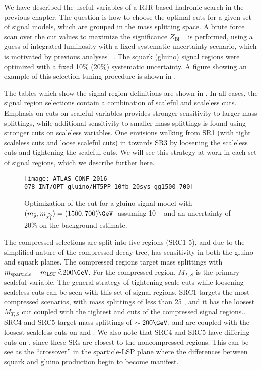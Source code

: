We have described the useful variables of a RJR-based hadronic search in the previous chapter.
The question is how to choose the optimal cuts for a given set of signal models, which are grouped in the mass splitting space.
A brute force scan over the cut values to maximize the significance  $Z_{\text{Bi}}$ ~\cite{Cousins:2008zz} is performed, using a guess of integrated luminosity with a fixed systematic uncertainty scenario, which is motivated by previous analyses ~\cite{0-leptonPaper,0LPaper_13TeV}.
The squark (gluino) signal regions were optimized with a fixed 10\% (20\%) systematic uncertainty.
A figure showing an example of this selection tuning procedure is shown in .

The tables which show the signal region definitions are shown in .
In all cases, the signal region selections contain a combination of scaleful and scaleless cuts.
Emphasis on cuts on scaleful variables provides stronger sensitivity to larger mass splittings, while additional sensitivity to smaller mass splittings is found using stronger cuts on scaleless variables.
One envisions walking from SR1 (with tight scaleless cuts and loose scaleful cuts) in  towards SR3 by loosening the scaleless cuts and tightening the scaleful cuts.
We will see this strategy at work in each set of signal regions, which we describe further here.

\begin{figure}[tbp]
\caption{Optimization of the  cut for a gluino signal model with $(m_{\gluino}, m_{\lsp} ) = (1500,700) \GeV~ $ assuming 10 \ifb~ and an uncertainty of 20\% on the background estimate.
} \label{fig:sr_optimization}
\texttt{[image: ATLAS-CONF-2016-078\_INT/OPT\_gluino/HT5PP\_10fb\_20sys\_gg1500\_700]}
\end{figure}

The compressed selections are split into five regions (SRC1-5), and due to the simplified nature of the compressed decay tree, has sensitivity in both the gluino and squark planes.
The compressed regions target mass splittings with $m_{\text{sparticle}} - m_{\text{LSP}} \tilde{<} 200 \GeV$.
For the compressed region, $M_{T, S}$ is the primary scaleful variable.
The general strategy of tightening scale cuts while loosening scaleless cuts can be seen with this set of signal regions.
SRC1 targets the most compressed scenarios, with mass splittings of less than 25 \GeV, and it has the loosest $M_{T, S}$ cut coupled with the tightest \risr and \dphiISR cuts of the compressed signal regions..
SRC4 and SRC5 target mass splittings of $\order 200 \GeV$, and are coupled with the loosest scaleless cuts on \risr and \dphiISR.
We also note that SRC4 and SRC5 have differing cuts on \NVjet, since these SRs are closest to the noncompressed regions.
This can be see as the ``crossover'' in the sparticle-LSP plane where the differences between squark and gluino production begin to become manifest.

